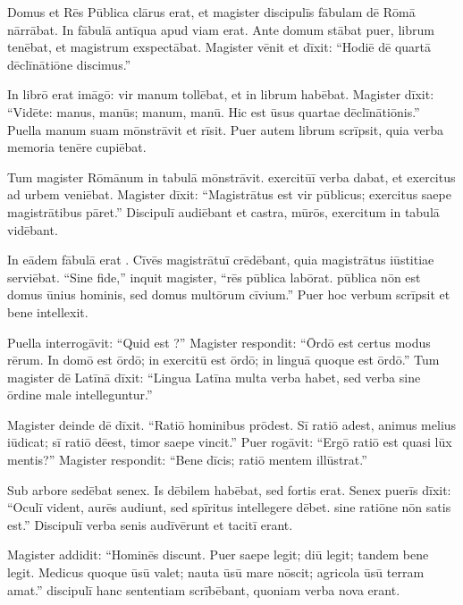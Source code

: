 \documentclass[12pt]{nextbook}
\begin{document}
\begin{readersection}{Domus et Rēs Pūblica}
 clārus erat, et magister discipulīs fābulam dē Rōmā nārrābat. In fābulā  antīqua apud viam erat. Ante domum stābat puer, librum tenēbat, et magistrum exspectābat. Magister vēnit et dīxit: “Hodiē dē quartā dēclīnātiōne discimus.”

In librō erat imāgō: vir manum tollēbat, et in  librum habēbat. Magister dīxit: “Vidēte: manus, manūs; manum, manū. Hic est ūsus quartae dēclīnātiōnis.” Puella manum suam mōnstrāvit et rīsit. Puer autem librum scrīpsit, quia verba memoria tenēre cupiēbat.

Tum magister  Rōmānum in tabulā mōnstrāvit.  exercitūī verba dabat, et exercitus ad urbem veniēbat. Magister dīxit: “Magistrātus est vir pūblicus; exercitus saepe magistrātibus pāret.” Discipulī audiēbant et castra, mūrōs, exercitum in tabulā vidēbant.

In eādem fābulā erat . Cīvēs magistrātuī crēdēbant, quia magistrātus iūstitiae serviēbat. “Sine fide,” inquit magister, “rēs pūblica labōrat.  pūblica nōn est domus ūnius hominis, sed domus multōrum cīvium.” Puer hoc verbum scrīpsit et bene intellexit.

Puella interrogāvit: “Quid est ?” Magister respondit: “Ōrdō est certus modus rērum. In domō est ōrdō; in exercitū est ōrdō; in linguā quoque est ōrdō.” Tum magister dē  Latīnā dīxit: “Lingua Latīna multa verba habet, sed verba sine ōrdine male intelleguntur.”

Magister deinde dē  dīxit. “Ratiō hominibus prōdest. Sī ratiō adest, animus melius iūdicat; sī ratiō dēest, timor saepe vincit.” Puer rogāvit: “Ergō ratiō est quasi lūx mentis?” Magister respondit: “Bene dīcis; ratiō mentem illūstrat.”

Sub arbore sedēbat senex. Is  dēbilem habēbat, sed  fortis erat. Senex puerīs dīxit: “Oculī vident, aurēs audiunt, sed spīritus intellegere dēbet.  sine ratiōne nōn satis est.” Discipulī verba senis audīvērunt et tacitī erant.

Magister addidit: “Hominēs  discunt. Puer saepe legit; diū legit; tandem bene legit. Medicus quoque ūsū valet; nauta ūsū mare nōscit; agricola ūsū terram amat.”  discipulī hanc sententiam scrībēbant, quoniam verba nova erant.


\end{readersection}
\end{document}
